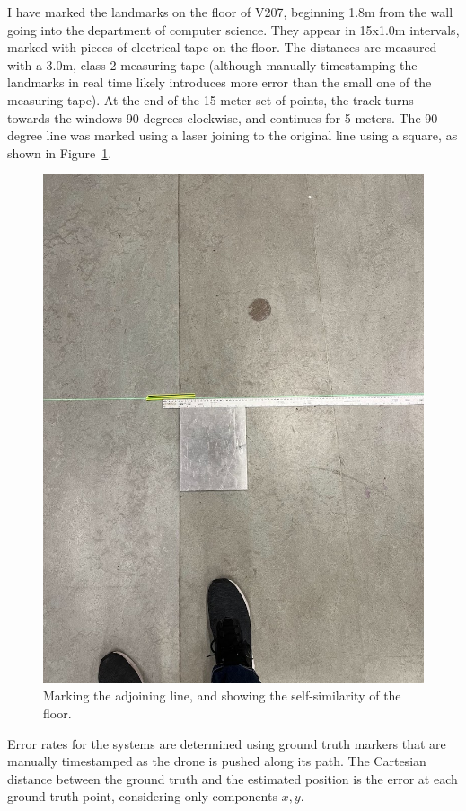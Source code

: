 I have marked the landmarks on the floor of V207,
beginning 1.8m from the wall going into the department of computer science.
They appear in 15x1.0m intervals, marked with pieces of electrical tape on the floor.
The distances are measured with a 3.0m, class 2 measuring tape
(although manually timestamping the landmarks in real time likely introduces more error than the small one of the
measuring tape).
At the end of the 15 meter set of points,
the track turns towards the windows 90 degrees clockwise,
and continues for 5 meters.
The 90 degree line was marked using a laser joining to the original line using a square,
as shown in Figure~\ref{figure:laser}.

\begin{figure}
	\centering
	\includegraphics[width=0.75\linewidth]{./images/laser.jpg}
	\caption{Marking the adjoining line, and showing the self-similarity of the floor.}
	\label{figure:laser}
\end{figure}

Error rates for the systems are determined using ground truth markers that are manually timestamped
as the drone is pushed along its path.
The Cartesian distance between the ground truth and the estimated position is the error at each ground
truth point, considering only components $x,y$.
